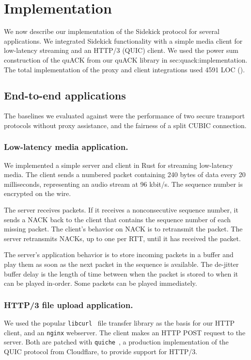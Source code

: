 \section{Implementation}
\label{sec:sidekick:implementation}



We now describe our implementation of the Sidekick protocol for several
applications. We integrated Sidekick functionality with a simple media client
for low-latency streaming and an HTTP/3 (QUIC) client. We used the power sum
construction of the quACK from our quACK library in \Cref
{sec:quack:implementation}. The total implementation of the proxy and client
integrations used 4591 LOC ().

\subsection{End-to-end applications}
\label{sec:sidekick:implementation:applications}

The baselines we evaluated against were the performance of two secure transport
protocols without proxy assistance, and the fairness of a split CUBIC connection.

\subsubsection{Low-latency media application.}
We implemented a simple server and client in Rust for streaming low-latency
media. The client sends a numbered packet containing 240 bytes of data every
20 milliseconds, representing an audio stream at 96 kbit/s.
The sequence number is encrypted on the wire.

The server receives packets. If it receives a nonconsecutive sequence number,
it sends a NACK back to the client that contains the sequence number of each
missing packet. The client's behavior on NACK is to retransmit the packet. The
server retransmits NACKs, up to one per RTT, until it has received the packet.

The server's application behavior is to store incoming packets in a buffer
and play them as soon as the next packet in the sequence is available. The
de-jitter buffer delay is the length of time between when the packet is stored
to when it can be played in-order. Some packets can be played immediately.

\subsubsection{HTTP/3 file upload application.}
We used the popular \texttt{libcurl}~\cite{libcurl} file transfer library as the basis for
our HTTP client, and an \texttt{nginx} webserver. The client makes an HTTP
POST request to the server. Both are patched with \texttt{quiche}~\cite{quiche}, a production
implementation of the QUIC protocol from Cloudflare, to provide support for
HTTP/3.

